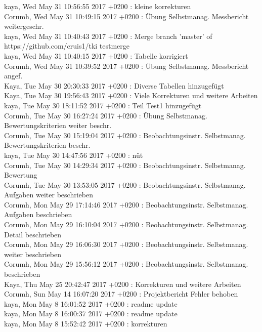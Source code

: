 kaya, Wed May 31 10:56:55 2017 +0200 : kleine korrekturen \\
Corumh, Wed May 31 10:49:15 2017 +0200 : Übung Selbstmanag. Messbericht weitergeschr. \\
kaya, Wed May 31 10:40:43 2017 +0200 : Merge branch 'master' of https://github.com/cruis1/tki testmerge \\
kaya, Wed May 31 10:40:15 2017 +0200 : Tabelle korrigiert \\
Corumh, Wed May 31 10:39:52 2017 +0200 : Übung Selbstmanag. Messbericht angef. \\
Kaya, Tue May 30 20:30:33 2017 +0200 : Diverse Tabellen hinzugefügt \\
Kaya, Tue May 30 19:56:43 2017 +0200 : Viele Korrekturen und weitere Arbeiten \\
kaya, Tue May 30 18:11:52 2017 +0200 : Teil Test1 hinzugefügt \\
Corumh, Tue May 30 16:27:24 2017 +0200 : Übung Selbstmanag. Bewertungskriterien weiter beschr. \\
Corumh, Tue May 30 15:19:04 2017 +0200 : Beobachtungsinstr. Selbstmanag. Bewertungskriterien beschr. \\
kaya, Tue May 30 14:47:56 2017 +0200 : nüt \\
Corumh, Tue May 30 14:29:34 2017 +0200 : Beobachtungsinstr. Selbstmanag. Bewertung \\
Corumh, Tue May 30 13:53:05 2017 +0200 : Beobachtungsinstr. Selbstmanag. Aufgaben weiter beschrieben \\
Corumh, Mon May 29 17:14:46 2017 +0200 : Beobachtungsinstr. Selbstmanag. Aufgaben beschrieben \\
Corumh, Mon May 29 16:10:04 2017 +0200 : Beobachtungsinstr. Selbstmanag. Detail beschrieben \\
Corumh, Mon May 29 16:06:30 2017 +0200 : Beobachtungsinstr. Selbstmanag. weiter beschrieben \\
Corumh, Mon May 29 15:56:12 2017 +0200 : Beobachtungsinstr. Selbstmanag. beschrieben \\
Kaya, Thu May 25 20:42:47 2017 +0200 : Korrekturen und weitere Arbeiten \\
Corumh, Sun May 14 16:07:20 2017 +0200 : Projektbericht Fehler behoben \\
kaya, Mon May 8 16:01:52 2017 +0200 : readme update \\
kaya, Mon May 8 16:00:37 2017 +0200 : readme update \\
kaya, Mon May 8 15:52:42 2017 +0200 : korrekturen \\
